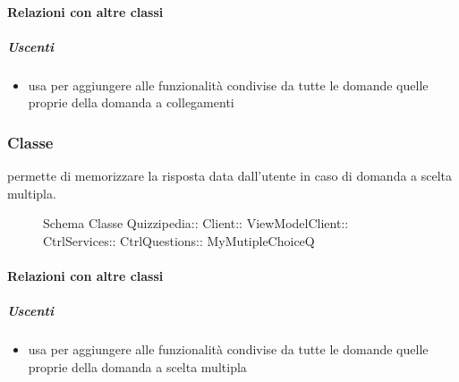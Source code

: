 \paragraph{Relazioni con altre classi}
\subparagraph{Uscenti}
\begin{itemize}
\item usa  per aggiungere alle funzionalità condivise da tutte le domande quelle proprie della domanda a collegamenti
\end{itemize}
\subsubsection{Classe }
permette di memorizzare la risposta data dall'utente in caso di domanda a scelta multipla.
\begin{figure}[H]
\centering
\noindent{}
\caption[Schema Classe MyMutipleChoiceQ]{Schema Classe Quizzipedia:: Client:: ViewModelClient:: CtrlServices:: CtrlQuestions:: MyMutipleChoiceQ}
\end{figure}
\paragraph{Relazioni con altre classi}
\subparagraph{Uscenti}
\begin{itemize}
\item usa  per aggiungere alle funzionalità condivise da tutte le domande quelle proprie della domanda a scelta multipla
\end{itemize}
